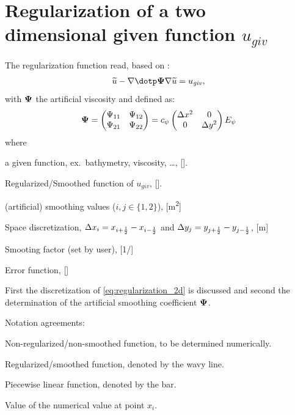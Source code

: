\chapter{Regularization of a two dimensional given function $u_{\mathit{giv}}$}
The regularization function read, based on \citet[eq.\ 6]{Borsboom1998}:
\begin{align}
    \widetilde{u} - \nabla \dotp \bPsi \nabla \widetilde{u} = u_{\mathit{giv}},
    \label{eq:regularization_2d}
\end{align}
with $\boldsymbol{\Psi}$ the artificial viscosity and defined as:
\begin{align}
    \boldsymbol{\Psi} =
    \begin{pmatrix}
        \Psi_{11} & \Psi_{12} \\
        \Psi_{21} & \Psi_{22}
    \end{pmatrix}
    = c_\psi \begin{pmatrix}
        \Delta x^2 & 0 \\
        0     & \Delta y^2
    \end{pmatrix}
    E_\psi
\end{align}
where
\begin{symbollist}
    \item[$u_{giv}$] a given function, ex.\ bathymetry, viscosity, \ldots, [\si{\cdot}].
    \item[$\widetilde{u}$] Regularized/Smoothed function of $u_{giv}$, [\si{\cdot}].
    \item[$\Psi_{ij}$] (artificial) smoothing values ($i,j \in \{1,2\}$), [\si{\square\metre}]
    \item[$\Dx, \Dy$] Space discretization, $\Delta x_{i} = x_{i+\frac{1}{2}} - x_{i-\frac{1}{2}}$ and $\Delta y_{j} = y_{j+\frac{1}{2}} - y_{j-\frac{1}{2}}$, [\si{\metre}]
    \item[$c_{\Psi}$] Smooting factor (set by user), [\si{1/\cdot}]
    \item[$E_\Psi$] Error function, [\si{\cdot}]
\end{symbollist}
First the discretization of \autoref{eq:regularization_2d} is discussed and second the determination of the artificial smoothing coefficient $\boldsymbol{\Psi}$.

Notation agreements:
\begin{symbollist}
    \item[$u$] Non-regularized/non-smoothed function, to be determined numerically.
    \item[$\widetilde u$] Regularized/smoothed function, denoted by the wavy line.
    \item[$\overline u$] Piecewise linear function, denoted by the bar.
    \item[$u_i$] Value of the numerical value at point $x_i$.
\end{symbollist}
